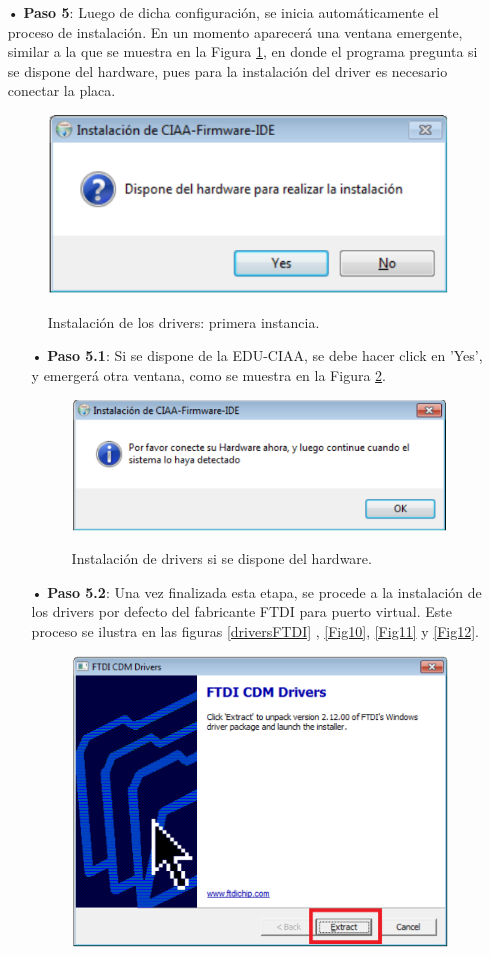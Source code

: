 \documentclass[12pt,letterpaper]{article}
\begin{document}
\begin{enumerate}
\item[•]\textbf{Paso 5}: Luego de dicha configuración, se inicia automáticamente el proceso de instalación. En un momento aparecerá una ventana emergente, similar a la que se muestra en la Figura \ref{Fig8}, en donde el programa pregunta si se dispone del hardware, pues para la instalación del driver es necesario conectar la placa.
\begin{figure}[!h]
\centering
\includegraphics[width=6 cm]{figuras/instalacion5.png}\\
\caption{Instalación de los drivers: primera instancia.}
\label{Fig8}
\end{figure}
\begin{enumerate}
\item[•]\textbf{Paso 5.1}: Si se dispone de la EDU-CIAA, se debe hacer click en 'Yes', y emergerá otra ventana, como se muestra en la Figura \ref{Fig9}.
\begin{figure}[!h]
\centering
\includegraphics[width=6 cm]{figuras/instalacion6.png}\\
\caption{Instalación de drivers si se dispone del hardware.}
\label{Fig9}
\end{figure}
\item[•]\textbf{Paso 5.2}: Una vez finalizada esta etapa, se procede a la instalación de los drivers por defecto del fabricante FTDI para puerto virtual. Este proceso se ilustra en las figuras \ref{driversFTDI} , \ref{Fig10}, \ref{Fig11} y \ref{Fig12}.
\begin{figure}[H]
\centering
\includegraphics[width=6 cm]{figuras/instalacion7.png}\\

\end{figure}
\end{enumerate}
\end{enumerate}
\end{document}
